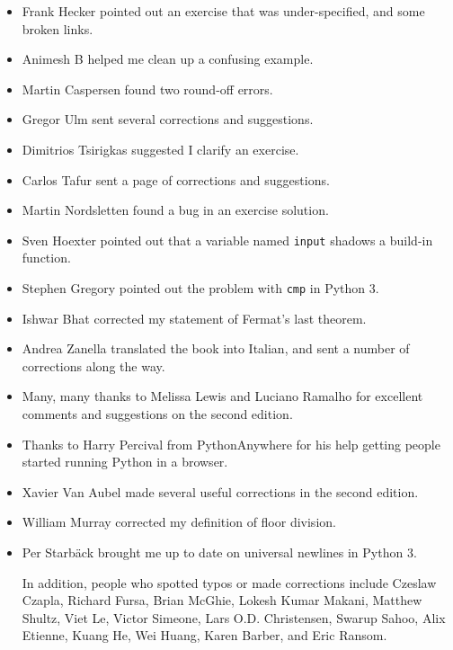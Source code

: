 \begin{itemize}
\item Frank Hecker pointed out an exercise that was under-specified, and
some broken links.

\item Animesh B helped me clean up a confusing example.

\item Martin Caspersen found two round-off errors.

\item Gregor Ulm sent several corrections and suggestions.

\item Dimitrios Tsirigkas suggested I clarify an exercise.

\item Carlos Tafur sent a page of corrections and suggestions.

\item Martin Nordsletten found a bug in an exercise solution.

\item Sven Hoexter pointed out that a variable named \texttt{input}
shadows a build-in function.

\item Stephen Gregory pointed out the problem with \texttt{cmp}
in Python 3.

\item Ishwar Bhat corrected my statement of Fermat's last theorem.

\item Andrea Zanella translated the book into Italian, and sent a
number of corrections along the way.

\item Many, many thanks to Melissa Lewis and Luciano Ramalho for
  excellent comments and suggestions on the second edition.

\item Thanks to Harry Percival from PythonAnywhere for his help
getting people started running Python in a browser.

\item Xavier Van Aubel made several useful corrections in the second
edition.

\item William Murray corrected my definition of floor division.

\item Per Starb{\"a}ck brought me up to date on universal newlines in Python 3. 


In addition, people who spotted typos or made corrections include
Czeslaw Czapla,
Richard Fursa, Brian McGhie, Lokesh Kumar Makani, Matthew Shultz, Viet
Le, Victor Simeone, Lars O.D. Christensen, Swarup Sahoo, Alix Etienne,
Kuang He, Wei Huang, Karen Barber, and Eric Ransom.

\end{itemize}

